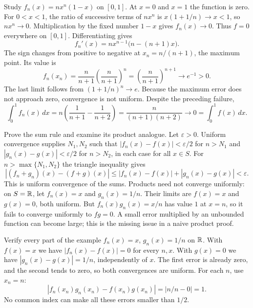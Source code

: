 \goal Study $f_n(x)=nx^n(1-x)$ on $[0,1]$.
At $x=0$ and $x=1$ the function is zero.
For $0<x<1$, the ratio of successive terms of $nx^n$ is
$x(1+1/n)\to x<1$, so $nx^n\to0$. Multiplication by the fixed number
$1-x$ gives $f_n(x)\to0$. Thus $f=0$ everywhere on $[0,1]$.
Differentiating gives
\[
 f_n'(x)=nx^{n-1}\bigl(n-(n+1)x\bigr).
\]
The sign changes from positive to negative at $x_n=n/(n+1)$, the maximum point.
Its value is
\[
 f_n(x_n)=\frac{n}{n+1}\left(\frac{n}{n+1}\right)^n
 =\left(\frac{n}{n+1}\right)^{n+1}\longrightarrow e^{-1}>0.
\]
The last limit follows from $(1+1/n)^n\to e$.
Because the maximum error does not approach zero, convergence is not uniform.
Despite the preceding failure,
\[
 \int_0^1f_n(x)\,dx
 =n\left(\frac1{n+1}-\frac1{n+2}\right)
 =\frac{n}{(n+1)(n+2)}\longrightarrow0
 =\int_0^1f(x)\,dx.
\]

\goal Prove the sum rule and examine its product analogue.
Let $\varepsilon>0$. Uniform convergence supplies $N_1,N_2$ such that
$|f_n(x)-f(x)|<\varepsilon/2$ for $n>N_1$ and
$|g_n(x)-g(x)|<\varepsilon/2$ for $n>N_2$, in each case for all $x\in S$.
For $n>\max\{N_1,N_2\}$ the triangle inequality gives
\[
 |(f_n+g_n)(x)-(f+g)(x)|
 \le |f_n(x)-f(x)|+|g_n(x)-g(x)|<\varepsilon.
\]
This is uniform convergence of the sums.
Products need not converge uniformly: on $S=\mathbb{R}$, let $f_n(x)=x$ and
$g_n(x)=1/n$. Their limits are $f(x)=x$ and $g(x)=0$, both uniform.
But $f_n(x)g_n(x)=x/n$ has value $1$ at $x=n$, so it fails to converge
uniformly to $fg=0$. A small error multiplied by an unbounded function
can become large; this is the missing issue in a naive product proof.

\goal Verify every part of the example $f_n(x)=x$, $g_n(x)=1/n$ on $\mathbb{R}$.
With $f(x)=x$ we have $|f_n(x)-f(x)|=0$ for every $n,x$.
With $g(x)=0$ we have $|g_n(x)-g(x)|=1/n$, independently of $x$.
The first error is already zero, and the second tends to zero, so both
convergences are uniform.
For each $n$, use $x_n=n$:
\[
 |f_n(x_n)g_n(x_n)-f(x_n)g(x_n)|=|n/n-0|=1.
\]
No common index can make all these errors smaller than $1/2$.

